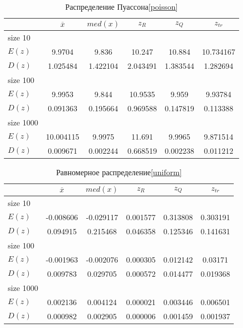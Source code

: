 \documentclass[12pt,a4paper]{article}
\begin{document}
\begin{table}[H]
    \centering
    \begin{tabular}{|l||c|c|c|c|c|}
        \hline
        & $\overline{x}$ & $med(x)$ & $z_R$ & $z_Q$ & $z_{tr}$\\\hline\hline
        size 10 & & & & &\\\hline
        $E(z)$ & 9.9704 & 9.836 & 10.247 & 10.884 & 10.734167\\\hline
        $D(z)$ & 1.025484 & 1.422104 & 2.043491 & 1.383544 & 1.282694\\\hline
        size 100 & & & & &\\\hline
        $E(z)$ & 9.9953 & 9.844 & 10.9535 & 9.959 & 9.93784\\\hline
        $D(z)$ & 0.091363 & 0.195664 & 0.969588 & 0.147819 & 0.113388\\\hline
        size 1000 & & & & &\\\hline
        $E(z)$ & 10.004115 & 9.9975 & 11.691 & 9.9965 & 9.871514\\\hline
        $D(z)$ & 0.009671 & 0.002244 & 0.668519 & 0.002238 & 0.011212\\\hline
    \end{tabular}
    \caption{Распределение Пуассона\eqref{poisson}}
    \label{tab:poisson}
\end{table}

\begin{table}[H]
    \centering
    \begin{tabular}{|l||c|c|c|c|c|}
        \hline
        & $\overline{x}$ & $med(x)$ & $z_R$ & $z_Q$ & $z_{tr}$\\\hline\hline
        size 10 & & & & &\\\hline
        $E(z)$ & -0.008606 & -0.029117 & 0.001577 & 0.313808 & 0.303191\\\hline
        $D(z)$ & 0.094915 & 0.215468 & 0.046358 & 0.125346 & 0.141631\\\hline
        size 100 & & & & &\\\hline
        $E(z)$ & -0.001963 & -0.002076 & 0.000305 & 0.012142 & 0.03171\\\hline
        $D(z)$ & 0.009783 & 0.029705 & 0.000572 & 0.014477 & 0.019368\\\hline
        size 1000 & & & & &\\\hline
        $E(z)$ & 0.002136 & 0.004124 & 0.000021 & 0.003446 & 0.006501\\\hline
        $D(z)$ & 0.000982 & 0.002905 & 0.000006 & 0.001459 & 0.001937\\\hline
    \end{tabular}
    \caption{Равномерное распределение\eqref{uniform}}
    \label{tab:uniform}
\end{table}
\end{document}

